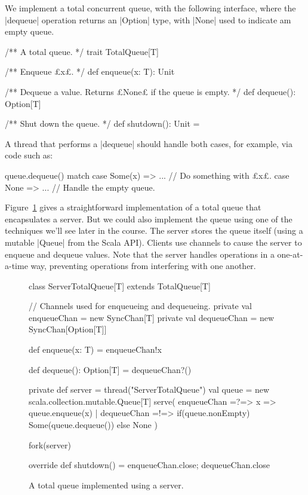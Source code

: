 
We implement a total concurrent queue, with the following
interface, where the |dequeue| operation returns an |Option| type, with |None|
used to indicate am empty queue.
%
\begin{scala}
/** A total queue. */
trait TotalQueue[T]{
  /** Enqueue £x£. */
  def enqueue(x: T): Unit

  /** Dequeue a value.  Returns £None£ if the queue is empty. */
  def dequeue(): Option[T]

  /** Shut down the queue. */
  def shutdown(): Unit = {}
}
\end{scala}

A thread that performs a |dequeue| should handle both cases, for example, via
code such as:
\begin{scala}
  queue.dequeue() match{
    case Some(x) => ... // Do something with £x£.
    case None => ... // Handle the empty queue.
  }
\end{scala}

Figure~\ref{fig:total-queue-server} gives a straightforward implementation of
a total queue that encapsulates a server.  But we could also implement the
queue using one of the techniques we'll see later in the course.  The server
stores the queue itself (using a mutable |Queue| from the Scala API)\@.
Clients use channels to cause the server to enqueue and dequeue values.  Note
that the server handles operations in a one-at-a-time way, preventing
operations from interfering with one another.



\begin{figure}
\begin{scala}
class ServerTotalQueue[T] extends TotalQueue[T]{
  // Channels used for enqueueing and dequeueing.
  private val enqueueChan = new SyncChan[T]
  private val dequeueChan = new SyncChan[Option[T]]

  def enqueue(x: T) = enqueueChan!x

  def dequeue(): Option[T] = dequeueChan?()

  private def server = thread("ServerTotalQueue"){
    val queue = new scala.collection.mutable.Queue[T]
    serve(
      enqueueChan =?=> { x => queue.enqueue(x) }
      | dequeueChan =!=> { 
          if(queue.nonEmpty) Some(queue.dequeue()) else None 
        }
    )
  }

  fork(server)

  override def shutdown() = { enqueueChan.close; dequeueChan.close }
}
\end{scala}
\caption{A total queue implemented using a server.}
\label{fig:total-queue-server}
\end{figure}

